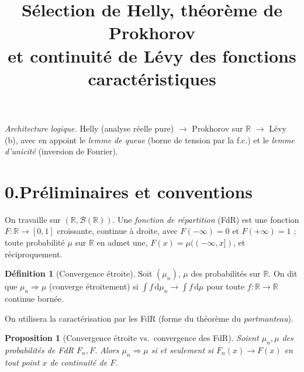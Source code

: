 \documentclass[11pt]{article}
\title{\bfseries Sélection de Helly, théorème de Prokhorov\\ et continuité de Lévy des fonctions caractéristiques}
\author{}
\date{}
\newcommand{\R}{\mathbb{R}}
\newcommand{\dd}{\,\mathrm{d}}
\newcommand{\weak}{\Rightarrow}
\theoremstyle{plain}
\newtheorem{proposition}[theoreme]{Proposition}
\theoremstyle{definition}
\newtheorem{definition}[theoreme]{Définition}
\theoremstyle{remark}
\begin{document}
\maketitle
\vspace{-2.5em}

\begin{center}\small
\emph{Architecture logique.} Helly (analyse réelle pure) $\longrightarrow$ Prokhorov sur $\R$
$\longrightarrow$ Lévy (b), avec en appoint le \emph{lemme de queue} (borne de tension par la f.c.)
et le \emph{lemme d'unicité} (inversion de Fourier).
\end{center}
\vspace{1em}

\section*{0.\quad Préliminaires et conventions}

On travaille sur $(\R,\mathcal B(\R))$. Une \emph{fonction de répartition} (FdR) est une fonction
$F:\R\to[0,1]$ croissante, continue à droite, avec $F(-\infty)=0$ et $F(+\infty)=1$ ; toute
probabilité $\mu$ sur $\R$ en admet une, $F(x)=\mu((-\infty,x])$, et réciproquement.

\begin{definition}[Convergence étroite]
Soit $(\mu_n)$, $\mu$ des probabilités sur $\R$. On dit que $\mu_n\weak\mu$ (converge étroitement) si
$\int f\dd\mu_n\to\int f\dd\mu$ pour toute $f:\R\to\R$ continue bornée.
\end{definition}

On utilisera la caractérisation par les FdR (forme du théorème du \emph{portmanteau}).

\begin{proposition}[Convergence étroite vs.\ convergence des FdR]\label{prop:port}
Soient $\mu_n,\mu$ des probabilités de FdR $F_n,F$. Alors $\mu_n\weak\mu$ si et seulement si
$F_n(x)\to F(x)$ en tout point $x$ de continuité de $F$.
\end{proposition}
\end{document}
